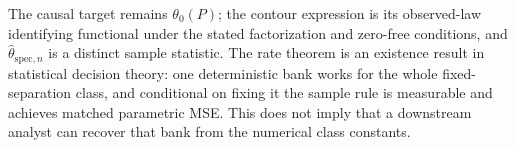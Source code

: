 The causal target remains \(\theta_0(P)\); the contour expression is its observed-law identifying functional under the stated factorization and zero-free conditions, and \(\widehat\theta_{\mathrm{spec},n}\) is a distinct sample statistic.  The rate theorem is an existence result in statistical decision theory: one deterministic bank works for the whole fixed-separation class, and conditional on fixing it the sample rule is measurable and achieves matched parametric MSE.  This does not imply that a downstream analyst can recover that bank from the numerical class constants.